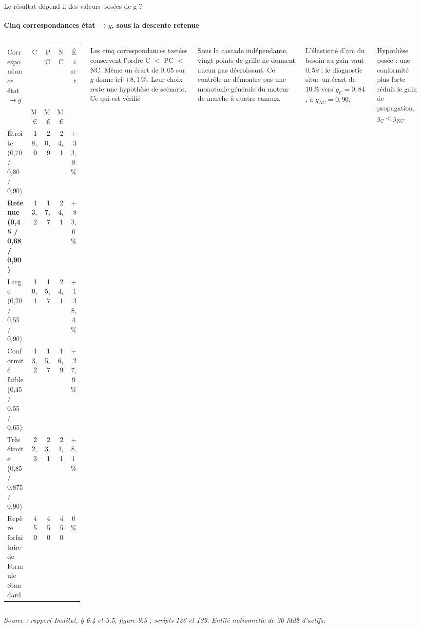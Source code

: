 \documentclass[aspectratio=169,10pt,t]{beamer}
\newcommand{\source}[1]{\par\vfill{\tiny\color{gris}\textit{Source : #1}}\par\vspace{-1mm}}
\renewcommand{\arraystretch}{1.25}
\begin{document}
\begin{frame}{Le résultat dépend-il des valeurs posées de g ?}
  \framesubtitle{\ajout Cinq correspondances état $\to g$, sous la descente retenue}
  \begin{columns}[T,onlytextwidth]
    \scriptsize
    \renewcommand{\arraystretch}{1.12}
    \begin{tabularx}{\linewidth}{@{}Y r r r r@{}}
      \toprule
      Correspondance état $\to g$ & C & PC & NC & Écart \\
      & M€ & M€ & M€ & \\
      \midrule
      Étroite (0,70 / 0,80 / 0,90) & 18,0 & 20,9 & 24,1 & +33,8\,\% \\
      \textbf{Retenue (0,45 / 0,68 / 0,90)} & 13,2 & 17,7 & 24,1 & +83,0\,\% \\
      Large (0,20 / 0,55 / 0,90) & 10,1 & 15,7 & 24,1 & +138,4\,\% \\
      Conformité faible (0,45 / 0,55 / 0,65) & 13,2 & 15,7 & 16,9 & +27,9\,\% \\
      Très étroite (0,85 / 0,875 / 0,90) & 22,3 & 23,1 & 24,1 & +8,1\,\% \\
      \midrule
      Repère forfaitaire de Formule Standard & 450 & 450 & 450 & 0\,\% \\
      \bottomrule
    \end{tabularx}\par\vspace{1.5mm}
    Les cinq correspondances testées conservent l'ordre C $<$ PC $<$ NC. Même un écart de $0{,}05$ sur $g$ donne ici $+8{,}1\,\%$. Leur choix reste une hypothèse de scénario.
    \scriptsize
    {\editorial\normalsize Ce qui est vérifié}\par\vspace{1mm}
    Sous la cascade indépendante, vingt points de grille ne donnent aucun pas décroissant. Ce contrôle ne démontre pas une monotonie générale du moteur de marche à quatre canaux.\par\vspace{1.5mm}
    L'élasticité d'arc du besoin au gain vaut $0{,}59$ ; le diagnostic situe un écart de $10\,\%$ vers $g_C=0{,}84$, à $g_{NC}=0{,}90$.\par\vspace{1.5mm}
    {\color{accent}Hypothèse posée :} une conformité plus forte réduit le gain de propagation, $g_C<g_{NC}$.
  \end{columns}
  \source{rapport Institut, § 6.4 et 9.5, figure 9.3 ; scripts 136 et 139. Entité notionnelle de 20 Md\$ d'actifs.}
\end{frame}
\end{document}
